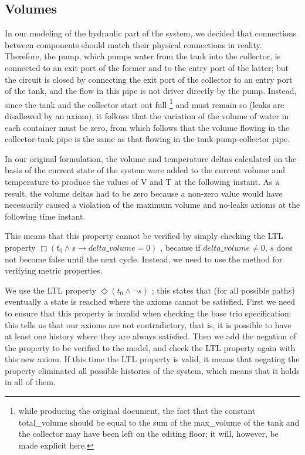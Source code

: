 \documentclass[a4paper,12pt]{article}
\begin{document}
\subsection{Volumes}

In our modeling of the hydraulic part of the system, we decided that connections between components should match their physical connections in reality. Therefore, the pump, which pumps water from the tank into the collector, is connected to an exit port of the former and to the entry port of the latter; but the circuit is closed by connecting the exit port of the collector to an entry port of the tank, and the flow in this pipe is not driver directly by the pump. Instead, since the tank and the collector start out full \footnote{while producing the original document, the fact that the constant total\_volume should be equal to the sum of the max\_volume of the tank and the collector may have been left on the editing floor; it will, however, be made explicit here.} and must remain so (leaks are disallowed by an axiom), it follows that the variation of the volume of water in each container must be zero, from which follows that the volume flowing in the collector-tank pipe is the same as that flowing in the tank-pump-collector pipe.

In our original formulation, the volume and temperature deltas calculated on the basis of the current state of the system were added to the current volume and temperature to produce the values of V and T at the following instant. As a result, the volume deltas had to be zero because a non-zero value would have necessarily caused a violation of the maximum volume and no-leaks axioms at the following time instant.

This means that this property cannot be verified by simply checking the LTL property $\Box  (t_0 \wedge s \rightarrow delta\_volume=0)$ , because if $delta\_volume \neq 0$, $s$ does not become false until the next cycle. Instead, we need to use the method for verifying metric properties.

We use the LTL property $\Diamond (t_0 \wedge \neg s)$ ; this states that (for all possible paths) eventually a state is reached where the axioms cannot be satisfied. First we need to ensure that this property is invalid when checking the base trio specification: this tells us that our axioms are not contradictory, that is, it is possible to have at least one history where they are always satisfied. Then we add the negation of the property to be verified to the model, and check the LTL property again with this new axiom. If this time the LTL property is valid, it means that negating the property eliminated all possible histories of the system, which means that it holds in all of them.
\end{document}
